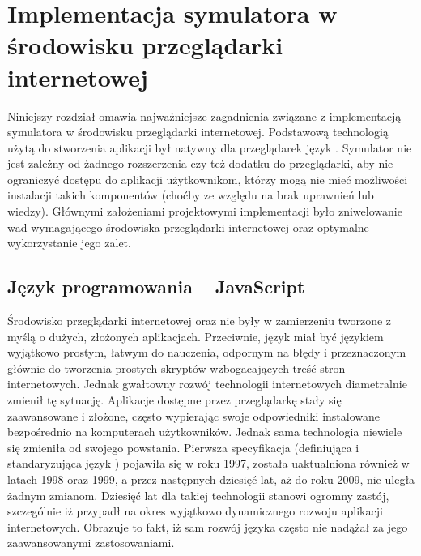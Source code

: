 \chapter{Implementacja symulatora w środowisku przeglądarki internetowej}

Niniejszy rozdział omawia najważniejsze zagadnienia związane z implementacją
symulatora \en w środowisku przeglądarki internetowej. Podstawową technologią
użytą do stworzenia aplikacji był natywny dla przeglądarek język \js.
Symulator nie jest zależny od żadnego rozszerzenia czy też dodatku do
przeglądarki, aby nie ograniczyć dostępu do aplikacji użytkownikom, którzy
mogą nie mieć możliwości instalacji takich komponentów (choćby ze względu na
brak uprawnień lub wiedzy). Głównymi założeniami projektowymi implementacji
było zniwelowanie wad wymagającego środowiska przeglądarki internetowej oraz
optymalne wykorzystanie jego zalet.

\section{Język programowania -- JavaScript}

Środowisko przeglądarki internetowej oraz \js nie były w zamierzeniu tworzone
z myślą o dużych, złożonych aplikacjach. Przeciwnie, język \js miał być
językiem wyjątkowo prostym, łatwym do nauczenia, odpornym na błędy i
przeznaczonym głównie do tworzenia prostych skryptów wzbogacających treść
stron internetowych. Jednak gwałtowny rozwój technologii internetowych
diametralnie zmienił tę sytuację. Aplikacje dostępne przez przeglądarkę stały
się zaawansowane i złożone, często wypierając swoje odpowiedniki instalowane
bezpośrednio na komputerach użytkowników. Jednak sama technologia niewiele się
zmieniła od swojego powstania. Pierwsza specyfikacja 
(definiująca i standaryzująca język ) pojawiła się w roku 1997,
została uaktualniona również w latach 1998 oraz 1999, a przez następnych
dziesięć lat, aż do roku 2009, nie uległa żadnym zmianom. Dziesięć lat dla
takiej technologii stanowi ogromny zastój, szczególnie iż przypadł na okres
wyjątkowo dynamicznego rozwoju aplikacji internetowych. Obrazuje to fakt, iż
sam rozwój języka często nie nadążał za jego zaawansowanymi zastosowaniami.

